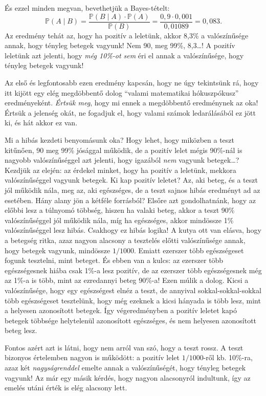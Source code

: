 \documentclass[magyar,]{book}
\begin{document}
És ezzel minden megvan, bevethetjük a Bayes-tételt:
\[
\mathbb{P}\left(A \mid B\right) = \frac{\mathbb{P}\left(B \mid A\right)\cdot \mathbb{P}\left(A\right)}{\mathbb{P}\left(B\right)}=\frac{0,\!9 \cdot 0,\!001}{0,\!01089}=0,\!083.
\]
Az eredmény tehát az, hogy ha pozitív a leletünk, akkor 8,3\% a valószínűsége annak, hogy tényleg betegek vagyunk! Nem 90, meg 99\%, 8,3\ldots! A pozitív leletünk azt jelenti, hogy \emph{még 10\%-ot sem} éri el annak a valószínűsége, hogy tényleg betegek vagyunk!

Az első és legfontosabb ezen eredmény kapcsán, hogy ne úgy tekintsünk rá, hogy itt kijött egy elég megdöbbentő dolog \enquote{valami matematikai hókuszpókusz} eredményeként. \emph{Értsük meg}, hogy mi ennek a megdöbbentő eredménynek az oka! Értsük a jelenség okát, ne fogadjuk el, hogy valami számok ledarálásából ez jött ki, és hát akkor ez van.

Mi a hibás kezdeti benyomásunk oka? Hogy lehet, hogy miközben a teszt kitűnően, 90 meg 99\% jósággal működik, de a pozitív lelet mégis 90\%-nál is nagyobb valószínűséggel azt jelenti, hogy igazából \emph{nem} vagyunk betegek\ldots? Kezdjük az elején: az érdekel minket, hogy ha pozitív a leletünk, mekkora valószínűséggel vagyunk betegek. Ki kap pozitív leletet? Az, aki beteg, és a teszt jól működik nála, meg az, aki egészséges, de a teszt sajnos hibás eredményt ad az esetében. Hány alany jön a kétféle forrásból? Elsőre azt gondolhatnánk, hogy az előbbi lesz a túlnyomó többség, hiszen ha valaki beteg, akkor a teszt 90\% valószínűséggel jól működik nála, míg ha egészséges, akkor mindössze 1\% valószínűséggel lesz hibás. Csakhogy ez hibás logika! A kutya ott van elásva, hogy a betegség ritka, azaz nagyon alacsony a tesztelés előtti valószínűsége annak, hogy betegek vagyunk, mindössze \(1/1000\). Emiatt ezerszer több egészségeset fogunk tesztelni, mint beteget. És ebben van a kulcs: az ezerszer több egészségesnek hiába csak 1\%-a lesz pozitív, de az ezerszer több egészségesnek még az 1\%-a is több, mint az ezredannyi beteg 90\%-a! Ezen múlik a dolog. Kicsi a valószínűsége, hogy egy egészségest elnéz a teszt, de annyival sokkal-sokkal-sokkal több egészségeset tesztelünk, hogy még ezeknek a kicsi hányada is több lesz, mint a helyesen azonosított betegek. Így végeredményben a pozitív leletet kapó betegek többsége helytelenül azonosított egészséges, és nem helyesen azonosított beteg lesz.

Fontos azért azt is látni, hogy nem arról van szó, hogy a teszt rossz. A teszt bizonyos értelemben nagyon is működött: a pozitív lelet \(1/1000\)-ről kb. 10\%-ra, azaz két \emph{nagyságrenddel} emelte annak a valószínűségét, hogy tényleg betegek vagyunk! Az már egy másik kérdés, hogy nagyon alacsonyról indultunk, így az emelés utáni érték is elég alacsony lett.
\end{document}
